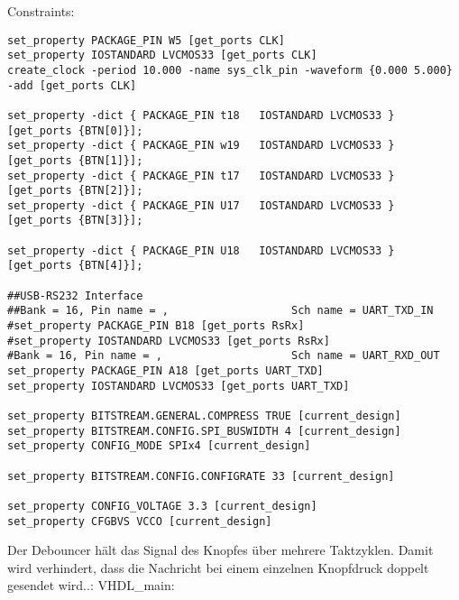 \documentclass{article}
\begin{document}
Constraints:\newline
\begin{verbatim}
set_property PACKAGE_PIN W5 [get_ports CLK]
set_property IOSTANDARD LVCMOS33 [get_ports CLK]
create_clock -period 10.000 -name sys_clk_pin -waveform {0.000 5.000} -add [get_ports CLK]

set_property -dict { PACKAGE_PIN t18   IOSTANDARD LVCMOS33 } [get_ports {BTN[0]}];
set_property -dict { PACKAGE_PIN w19   IOSTANDARD LVCMOS33 } [get_ports {BTN[1]}];
set_property -dict { PACKAGE_PIN t17   IOSTANDARD LVCMOS33 } [get_ports {BTN[2]}];
set_property -dict { PACKAGE_PIN U17   IOSTANDARD LVCMOS33 } [get_ports {BTN[3]}];
                                                                                    
set_property -dict { PACKAGE_PIN U18   IOSTANDARD LVCMOS33 } [get_ports {BTN[4]}];

##USB-RS232 Interface
##Bank = 16, Pin name = ,					Sch name = UART_TXD_IN
#set_property PACKAGE_PIN B18 [get_ports RsRx]
#set_property IOSTANDARD LVCMOS33 [get_ports RsRx]
#Bank = 16, Pin name = ,					Sch name = UART_RXD_OUT
set_property PACKAGE_PIN A18 [get_ports UART_TXD]
set_property IOSTANDARD LVCMOS33 [get_ports UART_TXD]

set_property BITSTREAM.GENERAL.COMPRESS TRUE [current_design]
set_property BITSTREAM.CONFIG.SPI_BUSWIDTH 4 [current_design]
set_property CONFIG_MODE SPIx4 [current_design]

set_property BITSTREAM.CONFIG.CONFIGRATE 33 [current_design]

set_property CONFIG_VOLTAGE 3.3 [current_design]
set_property CFGBVS VCCO [current_design]
\end{verbatim}
Der Debouncer h\"alt das Signal des Knopfes \"uber mehrere Taktzyklen. Damit wird verhindert, dass die Nachricht bei einem einzelnen Knopfdruck doppelt gesendet wird..:\newline
VHDL\_main:\newline
\end{document}
